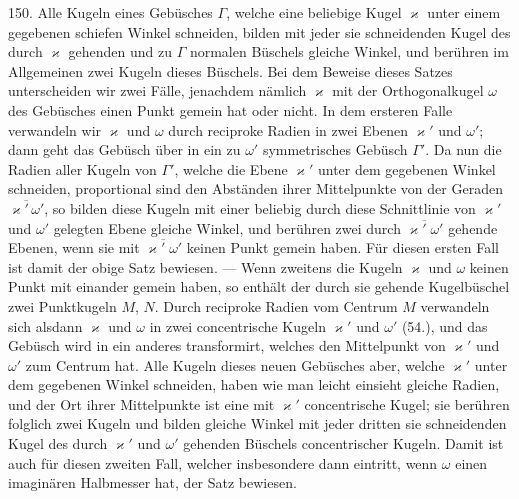 150. Alle Kugeln eines Geb\"usches $\varGamma$, welche eine beliebige
Kugel $\varkappa$ unter einem gegebenen schiefen Winkel
schneiden, bilden mit jeder sie schneidenden Kugel des durch
$\varkappa$ gehenden und zu $\varGamma$ normalen B\"uschels gleiche Winkel, und
ber\"uhren im Allgemeinen zwei Kugeln dieses B\"uschels. Bei
dem Beweise dieses Satzes unterscheiden wir zwei F\"alle,
jenachdem n\"amlich $\varkappa$ mit der Orthogonalkugel $\omega$ des Geb\"usches
einen Punkt gemein hat oder nicht. In dem ersteren
Falle verwandeln wir $\varkappa$ und $\omega$ durch reciproke Radien in
zwei Ebenen $\varkappa'$ und $\omega'$; dann geht das Geb\"usch \"uber in
ein zu $\omega'$ symmetrisches Geb\"usch $\varGamma'$. Da nun die Radien
aller Kugeln von $\varGamma'$, welche die Ebene $\varkappa'$ unter dem gegebenen
Winkel schneiden, proportional sind den Abst\"anden
ihrer Mittelpunkte von der Geraden $\overline{\varkappa'\,\omega'}$, so bilden diese
Kugeln mit einer beliebig durch diese Schnittlinie von $\varkappa'$
und $\omega'$ gelegten Ebene gleiche Winkel, und ber\"uhren zwei
durch $\overline{\varkappa'\;\omega'}$ gehende Ebenen, wenn sie mit $\overline{\varkappa'\;\omega'}$ keinen Punkt
gemein haben. F\"ur diesen ersten Fall ist damit der obige
Satz bewiesen. --- Wenn zweitens die Kugeln $\varkappa$ und $\omega$ keinen
Punkt mit einander gemein haben, so enth\"alt der durch sie
gehende Kugelb\"uschel zwei Punktkugeln $M$, $N$. Durch reciproke
Radien vom Centrum $M$ verwandeln sich alsdann $\varkappa$
und $\omega$ in zwei concentrische Kugeln $\varkappa'$ und $\omega'$ (54.), und
das Geb\"usch wird in ein anderes transformirt, welches den
Mittelpunkt von $\varkappa'$ und $\omega'$ zum Centrum hat. Alle Kugeln
dieses neuen Geb\"usches aber, welche $\varkappa'$ unter dem gegebenen
Winkel schneiden, haben wie man leicht einsieht gleiche
Radien, und der Ort ihrer Mittelpunkte ist eine mit $\varkappa'$ concentrische
Kugel; sie ber\"uhren folglich zwei Kugeln und
bilden gleiche Winkel mit jeder dritten sie schneidenden
Kugel des durch $\varkappa'$ und $\omega'$ gehenden B\"uschels concentrischer
Kugeln. Damit ist auch f\"ur diesen zweiten Fall, welcher
insbesondere dann eintritt, wenn $\omega$ einen imagin\"aren Halbmesser
hat, der Satz bewiesen.

